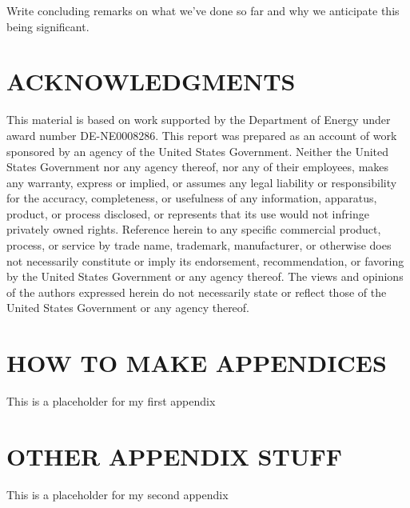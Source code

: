 \documentclass[12pt]{article}
\begin{document}
Write concluding remarks on what we've done so far and why we anticipate this being significant. 

%
\section*{ACKNOWLEDGMENTS}

This material is based on work supported by the Department of Energy under award number DE-NE0008286. This report was prepared as an account of work sponsored by an agency of the United States Government. Neither the United States Government nor any agency thereof, nor any of their employees, makes any warranty, express or implied, or assumes any legal liability or responsibility for the accuracy, completeness, or usefulness of any information, apparatus, product, or process disclosed, or represents that its use would not infringe privately owned rights. Reference herein to any specific commercial product, process, or service by trade name, trademark, manufacturer, or otherwise does not necessarily constitute or imply its endorsement, recommendation, or favoring by the United States Government or any agency thereof. The views and opinions of the authors expressed herein do not necessarily state or reflect those of the United States Government or any agency thereof.




\appendix

\makeatletter
\def\@seccntformat#1{APPENDIX \csname the#1\endcsname.~}
\makeatother

\section{HOW TO MAKE APPENDICES}
\label{app::a}

This is a placeholder for my first appendix

\section{OTHER APPENDIX STUFF}
\label{app::b}

This is a placeholder for my second appendix
\end{document}

